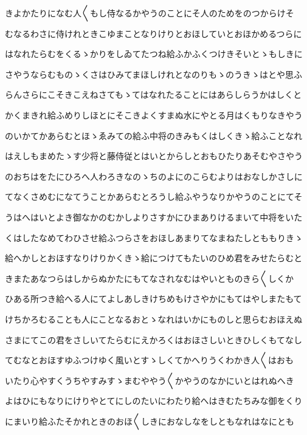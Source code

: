 \documentclass[a4paper,11pt,landscape]{ltjtarticle}
\begin{document}
\par\medskip
きよかたりになむ人〱もし侍なるかやうのことにそ人のためをのつからけそ
\par\medskip
むなるわさに侍けれときこゆまことなりけりとおほしていとおほかめるつらに
\par\medskip
はなれたらむをくるゝかりをしゐてたつね給ふかふくつけきそいとゝもしきに
\par\medskip
さやうならむものゝくさはひみてまほしけれとなのりもゝのうきゝはとや思ふ
\par\medskip
らんさらにこそきこえねさてもゝてはなれたることにはあらしらうかはしくと
\par\medskip
かくまきれ給ふめりしほとにそこきよくすまぬ水にやとる月はくもりなきやう
\par\medskip
のいかてかあらむとほゝゑみての給ふ中将のきみもくはしくきゝ給ふことなれ
\par\medskip
はえしもまめたゝす少将と藤侍従とはいとからしとおもひたりあそむやさやう
\par\medskip
のおちはをたにひろへ人わろきなのゝちのよにのこらむよりはおなしかさしに
\par\medskip
てなくさめむになてうことかあらむとろうし給ふやうなりかやうのことにてそ
\par\medskip
うはへはいとよき御なかのむかしよりさすかにひまありけるまいて中将をいた
\par\medskip
くはしたなめてわひさせ給ふつらさをおほしあまりてなまねたしとももりきゝ
\par\medskip
給へかしとおほすなりけりかくきゝ給につけてもたいのひめ君をみせたらむと
\par\medskip
きまたあなつらはしからぬかたにもてなされなむはやいとものきら〱しくか
\par\medskip
ひある所つき給へる人にてよしあしきけちめもけさやかにもてはやしまたもて
\par\medskip
けちかろむることも人にことなるおとゝなれはいかにものしと思らむおほえぬ
\par\medskip
さまにてこの君をさしいてたらむにえかろくはおほさしいときひしくもてなし
\par\medskip
てむなとおほすゆふつけゆく風いとすゝしくてかへりうくわかき人〱はおも
\par\medskip
いたり心やすくうちやすみすゝまむややう〱かやうのなかにいとはれぬへき
\par\medskip
よはひにもなりにけりやとてにしのたいにわたり給へはきむたちみな御をくり
\par\medskip
にまいり給ふたそかれときのおほ〱しきにおなしなをしともなれはなにとも
\par\medskip
\end{document}
